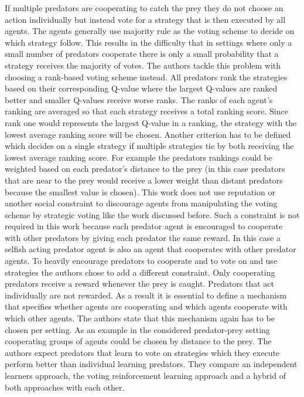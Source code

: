 \documentclass[conference]{IEEEtran}
\begin{document}
\newline
If multiple predators are cooperating to catch the prey they do not choose an action individually but instead vote for a strategy that is then executed by all agents. The agents generally use majority rule as the voting scheme to decide on which strategy follow. This results in the difficulty that in settings where only a small number of predators cooperate there is only a small probability that a strategy receives the majority of votes. The authors tackle this problem with choosing a rank-based voting scheme instead. All predators rank the strategies based on their corresponding Q-value where the largest Q-values are ranked better and smaller Q-values receive worse ranks. The ranks of each agent's ranking are averaged so that each strategy receives a total ranking score. Since rank one would represents the largest Q-value in a ranking, the strategy with the lowest average ranking score will be chosen. Another criterion has to be defined which decides on a single strategy if multiple strategies tie by both receiving the lowest average ranking score. For example the predators rankings could be weighted based on each predator's distance to the prey (in this case predators that are near to the prey would receive a lower weight than distant predators because the smallest value is chosen).
\newline
This work does not use reputation or another social constraint to discourage agents from manipulating the voting scheme by strategic voting like the work discussed before. Such a constraint is not required in this work because each predator agent is encouraged to cooperate with other predators by giving each predator the same reward. In this case a selfish acting predator agent is also an agent that cooperates with other predator agents. To heavily encourage predators to cooperate and to vote on and use strategies the authors chose to add a different constraint. Only cooperating predators receive a reward whenever the prey is caught. Predators that act individually are not rewarded.
\newline
As a result it is essential to define a mechanism that specifies whether agents are cooperating and which agents cooperate with which other agents. The authors state that this mechanism again has to be chosen per setting. As an example in the considered predator-prey setting cooperating groups of agents could be chosen by distance to the prey.
\newline
The authors expect predators that learn to vote on strategies which they execute perform better than individual learning predators. They compare an independent learners approach, the voting reinforcement learning approach and a hybrid of both approaches with each other.
\end{document}
